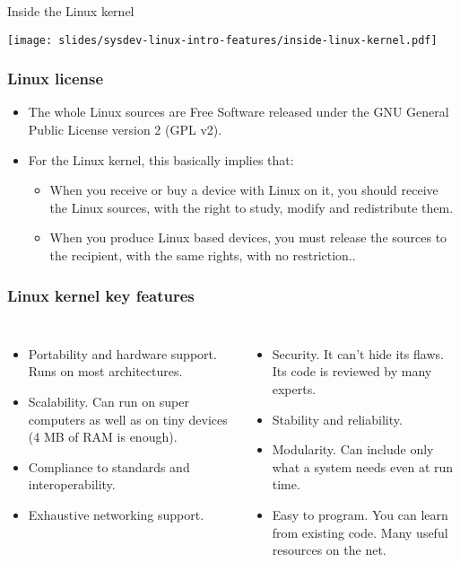 \begin{frame}{Inside the Linux kernel}
  \begin{center}
    \texttt{[image: slides/sysdev-linux-intro-features/inside-linux-kernel.pdf]}
  \end{center}
\end{frame}

\begin{frame}
  \frametitle{Linux license}
  \begin{itemize}
  \item The whole Linux sources are Free Software released under the
    GNU General Public License version 2 (GPL v2).
  \item For the Linux kernel, this basically implies that:
    \begin{itemize}
    \item When you receive or buy a device with Linux on it, you
      should receive the Linux sources, with the right to study,
      modify and redistribute them.
    \item When you produce Linux based devices, you must release the
      sources to the recipient, with the same rights, with no
      restriction..
    \end{itemize}
  \end{itemize}
\end{frame}

\begin{frame}
  \frametitle{Linux kernel key features}
  \begin{columns}
    \begin{itemize}
    \item Portability and hardware support. Runs on most
      architectures.
    \item Scalability. Can run on super computers as well as on tiny
      devices (4 MB of RAM is enough).
    \item Compliance to standards and interoperability.
    \item Exhaustive networking support.
    \end{itemize}
    \begin{itemize}
    \item Security. It can't hide its flaws. Its code is reviewed by
      many experts.
    \item Stability and reliability.
    \item Modularity. Can include only what a system needs even at run
      time.
    \item Easy to program. You can learn from existing code. Many
      useful resources on the net.
    \end{itemize}
  \end{columns}
\end{frame}

